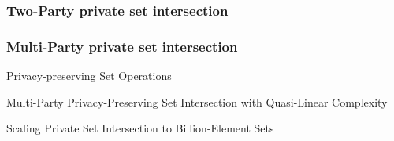 \subsubsection{Two-Party private set intersection}
%
%




\subsubsection{Multi-Party private set intersection}
Privacy-preserving Set Operations \cite{C:KLD05}

Multi-Party Privacy-Preserving Set Intersection with
Quasi-Linear Complexity \cite{DBLP:journals/ieicet/CheonJS12}

Scaling Private Set Intersection to Billion-Element Sets \cite{KMES14}

